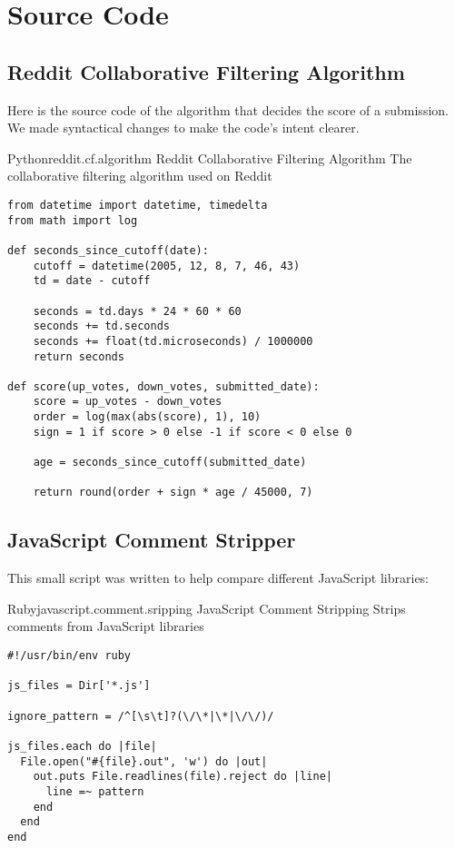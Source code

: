 \chapter{Source Code}

\section{Reddit Collaborative Filtering Algorithm}
\label{section:source.code.reddit}

Here is the source code of the algorithm that decides the score of a
submission. We made syntactical changes to make the code's intent clearer.

\begin{scode}{Python}{reddit.cf.algorithm}{%
  Reddit Collaborative Filtering Algorithm}{%
  The collaborative filtering algorithm used on Reddit}
\begin{lstlisting}
from datetime import datetime, timedelta
from math import log

def seconds_since_cutoff(date):
    cutoff = datetime(2005, 12, 8, 7, 46, 43)
    td = date - cutoff

    seconds = td.days * 24 * 60 * 60
    seconds += td.seconds
    seconds += float(td.microseconds) / 1000000
    return seconds

def score(up_votes, down_votes, submitted_date):
    score = up_votes - down_votes
    order = log(max(abs(score), 1), 10)
    sign = 1 if score > 0 else -1 if score < 0 else 0

    age = seconds_since_cutoff(submitted_date)

    return round(order + sign * age / 45000, 7)
\end{lstlisting}
\end{scode}


\section{JavaScript Comment Stripper}
\label{section:source.code.javascript.comment.stripper}

This small script was written to help
compare different JavaScript libraries:


\begin{scode}{Ruby}{javascript.comment.sripping}{%
  JavaScript Comment Stripping}{%
  Strips comments from JavaScript libraries}
\begin{lstlisting}
#!/usr/bin/env ruby

js_files = Dir['*.js']

ignore_pattern = /^[\s\t]?(\/\*|\*|\/\/)/

js_files.each do |file|
  File.open("#{file}.out", 'w') do |out| 
    out.puts File.readlines(file).reject do |line|
      line =~ pattern
    end
  end
end
\end{lstlisting}
\end{scode}

